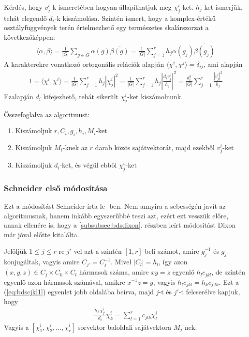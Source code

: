 Kérdés, hogy $v^i_j$-k ismeretében hogyan állapíthatjuk meg $\chi^i_j$-ket.
$h_j$-ket ismerjük, tehát elegendő $d_i$-k kiszámolása.
Szintén ismert, hogy a komplex-értékű osztályfüggvények terén értelmezhető egy természetes skalárszorzat a következőképpen:
\begin{align}
\label{eq:bdsscalar}
\langle \alpha, \beta \rangle = \frac{1}{|G|}\sum_{g\in G}\alpha(g)\overline{\beta(g)} = \frac{1}{|G|}\sum_{j=1}^r h_j \alpha(g_j) \overline{\beta(g_j)}
\end{align}
A karakterekre vonatkozó ortogonális relációk alapján $\langle \chi^i, \chi^j \rangle = \delta_{ij}$, ami alapján
\begin{align}
\label{eq:bdsdi1}
1 = \langle \chi^i, \chi^i \rangle = \frac{1}{|G|}\sum_{j=1}^r h_j |\chi^i_j|^2 = \frac{1}{|G|}\sum_{j=1}^r h_j \left|\frac{d_i v^i_j}{h_j}\right|^2 = 
\frac{d_i^2}{|G|}\sum_{j=1}^r \frac{|v^i_j|^2}{h_j}
\end{align}
Ezalapján $d_i$ kifejezhető, tehát sikerült $\chi^i_j$-ket kiszámolnunk.

\noindent
Összefoglalva az algoritmust:
\begin{enumerate}
\item Kiszámoljuk $r, C_i, g_i, h_i, M_i$-ket
\item Kiszámoljuk $M_i$-knek az $r$ darab közös sajátvektorát, majd ezekből $v^i_j$-ket
\item Kiszámoljuk $d_i$-ket, és végül ebből $\chi^i_j$-ket
\end{enumerate}

\subsubsection{Schneider első módosítása}
\label{subsubsec:bdssch1}
Ezt a módosítást Schneider írta le \cite{Sch90}-ben.
Nem annyira a sebességén javít az algoritmusnak, hanem inkább egyszerűbbé teszi azt, ezért ezt vesszük előre,
annak ellenére is, hogy a \ref{subsubsec:bdsdixon}. részben leírt módosítást Dixon már jóval előtte kitalálta.

Jelöljük $1\le j \le r$-re $j'$-vel azt a szintén $[1, r]$-beli számot, amire $g_j^{-1}$ és $g_{j'}$ konjugáltak,
vagyis amire $C_{j'}=C_j^{-1}$. Mivel $|C_l|=h_l$, így azon $(x, y, z)\in C_j \times C_k \times C_l$ hármasok száma,
amire $xy=z$ egyenlő $h_l c_{jkl}$, de szintén egyenlő azon hármasok számával, amikre $x^{-1}z=y$, vagyis $h_l c_{jkl}=h_k c_{j'lk}$.
Ezt a (\ref{eq:bdscjkl1}) egyenlet jobb oldalába beírva, majd $j$-t és $j'$-t felcserélve kapjuk, hogy
\begin{align}
\label{eq:bdssch1}
\frac{h_{j'}\chi^i_{j'}}{d_i}\chi^i_k=\sum_{l=1}^r c_{jlk}\chi^i_l
\end{align}
Vagyis a $[\chi^i_1, \chi^i_2, \dots, \chi^i_r]$ sorvektor baloldali sajátvektora $M_j$-nek.

